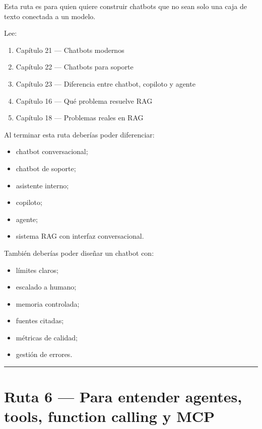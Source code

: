 Esta ruta es para quien quiere construir chatbots que no sean solo una
caja de texto conectada a un modelo.

Lee:

\begin{enumerate}
\def\labelenumi{\arabic{enumi}.}
\tightlist
\item
  Capítulo 21 --- Chatbots modernos
\item
  Capítulo 22 --- Chatbots para soporte
\item
  Capítulo 23 --- Diferencia entre chatbot, copiloto y agente
\item
  Capítulo 16 --- Qué problema resuelve RAG
\item
  Capítulo 18 --- Problemas reales en RAG
\end{enumerate}

Al terminar esta ruta deberías poder diferenciar:

\begin{itemize}
\tightlist
\item
  chatbot conversacional;
\item
  chatbot de soporte;
\item
  asistente interno;
\item
  copiloto;
\item
  agente;
\item
  sistema RAG con interfaz conversacional.
\end{itemize}

También deberías poder diseñar un chatbot con:

\begin{itemize}
\tightlist
\item
  límites claros;
\item
  escalado a humano;
\item
  memoria controlada;
\item
  fuentes citadas;
\item
  métricas de calidad;
\item
  gestión de errores.
\end{itemize}

\begin{center}\rule{0.5\linewidth}{0.5pt}\end{center}

\section{Ruta 6 --- Para entender agentes, tools, function calling y
MCP}\label{ruta-6-para-entender-agentes-tools-function-calling-y-mcp}

